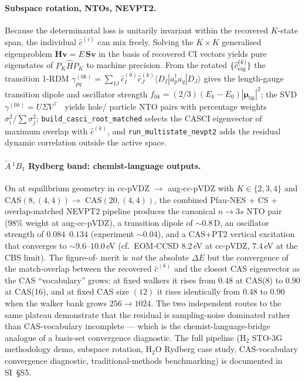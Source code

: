 \documentclass[journal=jctcce,manuscript=article,layout=traditional]{achemso}
\begin{document}
\paragraph{Subspace rotation, NTOs, NEVPT2.}
Because the determinantal loss is unitarily invariant within the
recovered $K$-state span, the individual $\widehat c^{(i)}$ can
mix freely. Solving the $K{\times}K$ generalised eigenproblem
$\mathbf{H}\mathbf{v} = E\,\mathbf{S}\mathbf{v}$ in the basis of
recovered CI vectors yields pure eigenstates of $P_K \hat H P_K$
to machine precision. From the rotated $\{\widehat c^{(k)}_{\rm eig}\}$
the transition 1-RDM
$\gamma^{(0k)}_{pq} = \sum_{IJ} \widehat c^{(0)}_I \widehat c^{(k)}_J
\langle D_I| a^\dagger_p a_q |D_J\rangle$
gives the length-gauge transition dipole and oscillator strength
$f_{0k} = (2/3)(E_k-E_0)|\boldsymbol{\mu}_{0k}|^2$; the SVD
$\gamma^{(0k)} = U\Sigma V^\top$~\cite{MartinNTO2003} yields hole/
particle NTO pairs with percentage weights $\sigma_i^2/\sum \sigma_j^2$;
\texttt{build\_casci\_root\_matched} selects the CASCI eigenvector of
maximum overlap with $\widehat c^{(k)}$, and
\texttt{run\_multistate\_nevpt2} adds the residual dynamic
correlation outside the active space.

\paragraph{ \texorpdfstring{$\tilde A\,^1B_1$}{1B1}
Rydberg band: chemist-language outputs.}
On  at equilibrium geometry in cc-pVDZ $\to$ aug-cc-pVDZ
with $K \in \{2,3,4\}$ and CAS$(8,(4,4)) \to$ CAS$(20,(4,4))$, the
combined Pfau-NES + CS + overlap-matched NEVPT2 pipeline produces
the canonical $n\!\to\!3s$ NTO pair (98\% weight at aug-cc-pVDZ),
a transition dipole of $\sim 0.8$\,D, an oscillator strength of
$0.084$--$0.134$ (experiment $\sim 0.04$), and a CAS+PT2 vertical
excitation that converges to $\sim 9.6$--$10.0$\,eV (cf.\ EOM-CCSD
$8.2$\,eV at cc-pVDZ, $7.4$\,eV at the CBS limit). The figure-of-
merit is \emph{not} the absolute $\Delta E$ but the convergence of
the match-overlap between the recovered $\widehat c^{(k)}$ and the
closest CAS eigenvector as the CAS ``vocabulary'' grows: at
fixed walkers it rises from $0.48$ at CAS(8) to $0.90$ at CAS(16),
and at fixed CAS size $(12)$ it rises identically from $0.48$ to
$0.90$ when the walker bank grows $256\to 1024$. The two
independent routes to the same plateau demonstrate that the
residual is sampling-noise dominated rather than CAS-vocabulary
incomplete --- which is the chemist-language-bridge analogue of a
basis-set convergence diagnostic. The full pipeline (H$_2$ STO-3G
methodology demo, subspace rotation, H$_2$O Rydberg case study,
CAS-vocabulary convergence diagnostic, traditional-methods
benchmarking) is documented in SI~\S S5.
\end{document}
